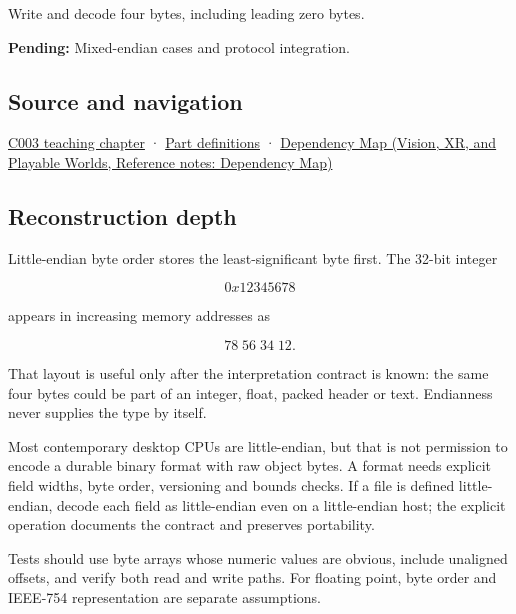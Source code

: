 Write and decode four bytes, including leading zero bytes.

\textbf{Pending:} Mixed-endian cases and protocol integration.

\subsection{Source and navigation}\label{appendix-367b6abf460e-source-and-navigation}

\hyperref[01-foundations-i-ch002-where-the-bytes-live]{C003 teaching chapter} · \hyperref[appendix-fd090d982a15-m003---parts-41-60]{Part definitions} · \href{../07-Vision-XR-and-Playable-Worlds/main.pdf\#nameddest=appendix-4ad47bdd269a}{Dependency Map (Vision, XR, and Playable Worlds, Reference notes: Dependency Map)}

\subsection{Reconstruction depth}\label{appendix-367b6abf460e-reconstruction-depth}

Little-endian byte order stores the least-significant byte first. The 32-bit integer

\[
0x12345678
\]

appears in increasing memory addresses as

\[
78\;56\;34\;12.
\]

That layout is useful only after the interpretation contract is known: the same four bytes could be part of an integer, float, packed header or text. Endianness never supplies the type by itself.

Most contemporary desktop CPUs are little-endian, but that is not permission to encode a durable binary format with raw object bytes. A format needs explicit field widths, byte order, versioning and bounds checks. If a file is defined little-endian, decode each field as little-endian even on a little-endian host; the explicit operation documents the contract and preserves portability.

Tests should use byte arrays whose numeric values are obvious, include unaligned offsets, and verify both read and write paths. For floating point, byte order and IEEE-754 representation are separate assumptions.
